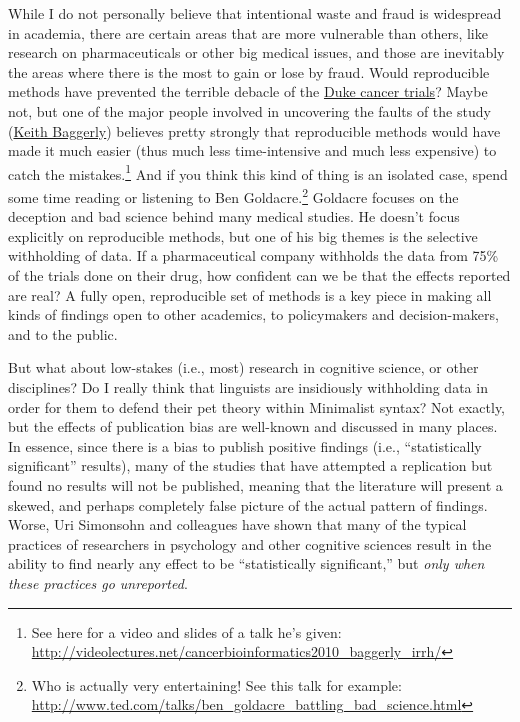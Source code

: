 \documentclass{book}
\begin{document}
While I do not personally believe that intentional waste and fraud is widespread in academia, there are certain areas that are more vulnerable than others, like research on pharmaceuticals or other big medical issues, and those are inevitably the areas where there is the most to gain or lose by fraud. Would reproducible methods have prevented the terrible debacle of the \href{http://news.sciencemag.org/scienceinsider/2011/09/flawed-cancer-trial-at-duke-sparks.html}{Duke cancer trials}? Maybe not, but one of the major people involved in uncovering the faults of the study (\href{http://odin.mdacc.tmc.edu/~kabaggerly/}{Keith Baggerly}) believes pretty strongly that reproducible methods would have made it much easier (thus much less time-intensive and much less expensive) to catch the mistakes.\footnote{See here for a video and slides of a talk he's given:\\ \href{http://videolectures.net/cancerbioinformatics2010_baggerly_irrh/}{http://videolectures.net/cancerbioinformatics2010\_baggerly\_irrh/}
 }  And if you think this kind of thing is an isolated case, spend some time reading or listening to Ben Goldacre.\footnote{Who is actually very entertaining!  See this talk for example:\\ \href{http://www.ted.com/talks/ben_goldacre_battling_bad_science.html}{http://www.ted.com/talks/ben\_goldacre\_battling\_bad\_science.html}
 } Goldacre focuses on the deception and bad science behind many medical studies. He doesn't focus explicitly on reproducible methods, but one of his big themes is the selective withholding of data. If a pharmaceutical company withholds the data from 75\% of the trials done on their drug, how confident can we be that the effects reported are real?  A fully open, reproducible set of methods is a key piece in making all kinds of findings open to other academics, to policymakers and decision-makers, and to the public.

But what about low-stakes (i.e., most) research in cognitive science, or other disciplines?  Do I really think that linguists are insidiously withholding data in order for them to defend their pet theory within Minimalist syntax?  Not exactly, but the effects of publication bias are well-known and discussed in many places. In essence, since there is a bias to publish positive findings (i.e., ``statistically significant'' results), many of the studies that have attempted a replication but found no results will not be published, meaning that the literature will present a skewed, and perhaps completely false picture of the actual pattern of findings.  Worse, Uri Simonsohn and colleagues \parencite{simmons2011false} have shown that many of the typical practices of researchers in psychology and other cognitive sciences result in the ability to find nearly any effect to be ``statistically significant,'' but \emph{only when these practices go unreported}.
\end{document}
